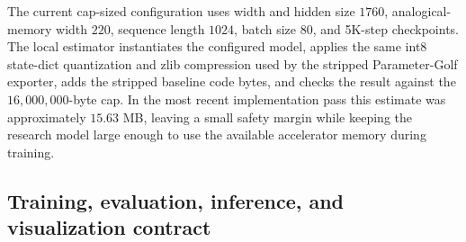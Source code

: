 \documentclass[11pt]{article}
\begin{document}
The current cap-sized configuration uses width and hidden size \(1760\), analogical-memory width \(220\), sequence length \(1024\), batch size \(80\), and 5K-step checkpoints.  The local estimator instantiates the configured model, applies the same int8 state-dict quantization and zlib compression used by the stripped Parameter-Golf exporter, adds the stripped baseline code bytes, and checks the result against the \(16{,}000{,}000\)-byte cap.  In the most recent implementation pass this estimate was approximately \(15.63\) MB, leaving a small safety margin while keeping the research model large enough to use the available accelerator memory during training.

\subsection{Training, evaluation, inference, and visualization contract}
\end{document}
